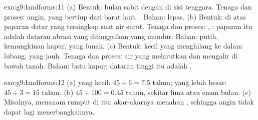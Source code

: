 \begin{solution}{exo:g9:landforms:11}
(a) Bentuk:  bulan sabit dengan  di sisi tenggara.
Tenaga dan proses: angin, yang bertiup dari barat laut, .
Bahan:  lepas. (b) Bentuk:  di atas paparan datar yang
tersingkap saat air surut. Tenaga dan proses: , ; paparan itu
adalah dataran abrasi yang ditinggalkan  yang mundur. Bahan: 
putih, kemungkinan kapur,  yang lunak. (c) Bentuk:  kecil yang
menghilang ke dalam lubang,  yang jauh. Tenaga dan proses: air
yang melarutkan  dan mengalir di bawah tanah. Bahan: batu kapur;
dataran tinggi itu adalah .
\end{solution}

\begin{solution}{exo:g9:landforms:12}
(a)  yang kecil: $45 \div 6 = 7.5$ tahun;  yang lebih besar: $45 \div 3 =
15$ tahun. (b) $45 \div 100 = 0.45$ tahun, sekitar lima atau enam bulan.
(c) Misalnya, menanam rumput di  itu: akar-akarnya menahan
, sehingga angin tidak dapat lagi menerbangkannya.
\end{solution}

